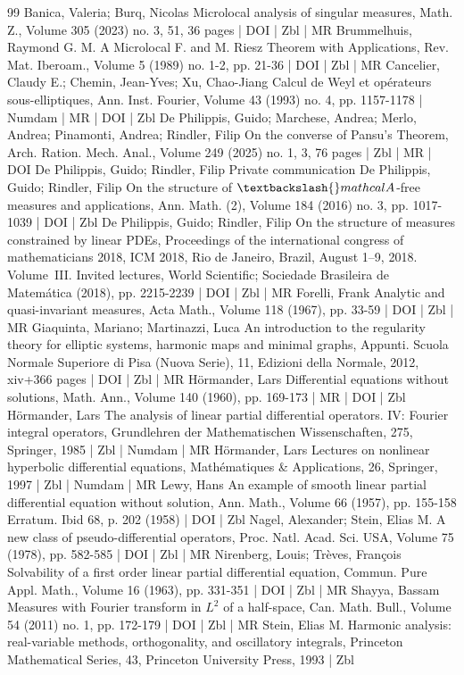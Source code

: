 \documentclass[10pt]{amsart}
\theoremstyle{definition}\newtheorem{defi}[theo]{Definition}\newtheorem{rema}[theo]{Remark}\newtheorem{exam}[theo]{Example}\newtheorem{exem}[theo]{Example}\newtheorem{nota}[theo]{Notation}
\begin{document}
\begin{thebibliography}{99}
 Banica, Valeria; Burq, Nicolas Microlocal analysis of singular measures, Math. Z., Volume 305 (2023) no. 3, 51, 36 pages | DOI | Zbl | MR
 Brummelhuis, Raymond G. M. A Microlocal F. and M. Riesz Theorem with Applications, Rev. Mat. Iberoam., Volume 5 (1989) no. 1-2, pp. 21-36 | DOI | Zbl | MR
 Cancelier, Claudy E.; Chemin, Jean-Yves; Xu, Chao-Jiang Calcul de Weyl et opérateurs sous-elliptiques, Ann. Inst. Fourier, Volume 43 (1993) no. 4, pp. 1157-1178 | Numdam | MR | DOI | Zbl
 De Philippis, Guido; Marchese, Andrea; Merlo, Andrea; Pinamonti, Andrea; Rindler, Filip On the converse of Pansu’s Theorem, Arch. Ration. Mech. Anal., Volume 249 (2025) no. 1, 3, 76 pages | Zbl | MR | DOI
 De Philippis, Guido; Rindler, Filip Private communication
 De Philippis, Guido; Rindler, Filip On the structure of $\textbackslash{}mathcal{A}$-free measures and applications, Ann. Math. (2), Volume 184 (2016) no. 3, pp. 1017-1039 | DOI | Zbl
 De Philippis, Guido; Rindler, Filip On the structure of measures constrained by linear PDEs, Proceedings of the international congress of mathematicians 2018, ICM 2018, Rio de Janeiro, Brazil, August 1–9, 2018. Volume III. Invited lectures, World Scientific; Sociedade Brasileira de Matemática (2018), pp. 2215-2239 | DOI | Zbl | MR
 Forelli, Frank Analytic and quasi-invariant measures, Acta Math., Volume 118 (1967), pp. 33-59 | DOI | Zbl | MR
 Giaquinta, Mariano; Martinazzi, Luca An introduction to the regularity theory for elliptic systems, harmonic maps and minimal graphs, Appunti. Scuola Normale Superiore di Pisa (Nuova Serie), 11, Edizioni della Normale, 2012, xiv+366 pages | DOI | Zbl | MR
 Hörmander, Lars Differential equations without solutions, Math. Ann., Volume 140 (1960), pp. 169-173 | MR | DOI | Zbl
 Hörmander, Lars The analysis of linear partial differential operators. IV: Fourier integral operators, Grundlehren der Mathematischen Wissenschaften, 275, Springer, 1985 | Zbl | Numdam | MR
 Hörmander, Lars Lectures on nonlinear hyperbolic differential equations, Mathématiques \& Applications, 26, Springer, 1997 | Zbl | Numdam | MR
 Lewy, Hans An example of smooth linear partial differential equation without solution, Ann. Math., Volume 66 (1957), pp. 155-158 Erratum. Ibid 68, p. 202 (1958) | DOI | Zbl
 Nagel, Alexander; Stein, Elias M. A new class of pseudo-differential operators, Proc. Natl. Acad. Sci. USA, Volume 75 (1978), pp. 582-585 | DOI | Zbl | MR
 Nirenberg, Louis; Trèves, François Solvability of a first order linear partial differential equation, Commun. Pure Appl. Math., Volume 16 (1963), pp. 331-351 | DOI | Zbl | MR
 Shayya, Bassam Measures with Fourier transform in ${L}^2$ of a half-space, Can. Math. Bull., Volume 54 (2011) no. 1, pp. 172-179 | DOI | Zbl | MR
 Stein, Elias M. Harmonic analysis: real-variable methods, orthogonality, and oscillatory integrals, Princeton Mathematical Series, 43, Princeton University Press, 1993 | Zbl
\end{thebibliography}
\end{document}
